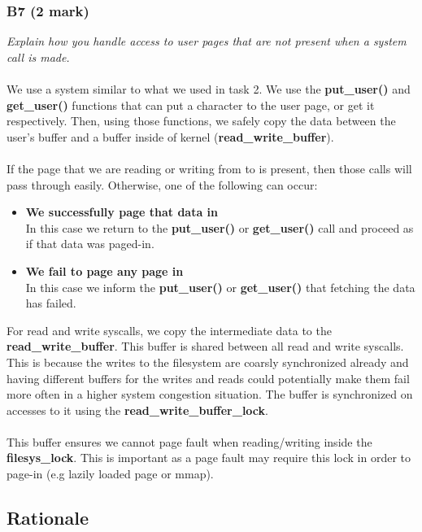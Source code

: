 \documentclass{report}
\newcommand{\question}[1]{\textit{#1} \ }
\newcommand{\bullpara}[2]{\item \textbf{#1} \ #2}
\newcommand{\fun}[1]{\textcolor{Emerald}{\textbf{#1}}}
\newcommand{\var}[1]{\textcolor{RoyalPurple}{\textbf{#1}}}
\newcommand{\compitem}[1]{\begin{itemize}\setlength\itemsep{-0.1em}#1\end{itemize}}
\begin{document}
			\subsubsection*{B7 (2 mark)}
				\question{Explain how you handle access to user pages that are not 
				present when a system call is made.}
				\\
				\\ We use a system similar to what we used in task 2.
				We use the \fun{put\_user()} and \fun{get\_user()} functions that
				can put a character to the user page, or get it respectively. Then,
				using those functions, we safely copy the data between the user's buffer and a buffer inside of kernel (\var{read\_write\_buffer}). 
				\\
				\\If the page that we are reading or writing from to
				is present, then those calls will pass through easily. Otherwise,
				one of the following can occur:
				\compitem{
					\bullpara{We successfully page that data in}{
					\\ In this case we return to the \fun{put\_user()} or \fun{get\_user()} call
					and proceed as if that data was paged-in.}
					\bullpara{We fail to page any page in}{
					\\ In this case we inform the \fun{put\_user()} or \fun{get\_user()} that fetching
					the data has failed.}
				}
				For read and write syscalls, we copy the intermediate data to the \var{read\_write\_buffer}. 
				This buffer is shared between all read and write syscalls. This is because the writes
				to the filesystem are coarsly synchronized already and having different buffers for the writes and reads
				could potentially make them fail more often in a higher system congestion situation. The buffer is
				synchronized on accesses to it using the \var{read\_write\_buffer\_lock}.
				\\
				\\ This buffer ensures we cannot page fault when reading/writing inside the \var{filesys\_lock}. 
				This is important as a page fault may require this lock in order to page-in (e.g lazily loaded page or mmap).
			
		\subsection*{Rationale}
\end{document}
